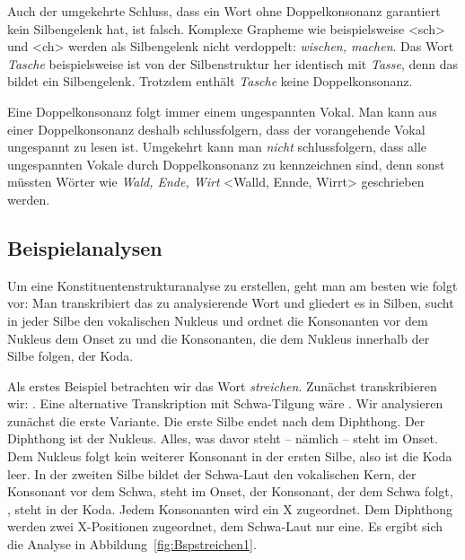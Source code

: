 Auch der umgekehrte Schluss, dass ein Wort ohne Doppelkonsonanz garantiert kein Silbengelenk hat, ist falsch. Komplexe Grapheme wie beispielsweise <sch> und <ch> werden als Silbengelenk nicht verdoppelt: \textit{wischen, machen}. Das Wort \textit{Tasche} beispielsweise ist von der Silbenstruktur her identisch mit \textit{Tasse}, denn das  bildet ein Silbengelenk. Trotzdem enthält \textit{Tasche} keine Doppelkonsonanz.

Eine Doppelkonsonanz folgt immer einem ungespannten Vokal. Man kann aus einer Doppelkonsonanz deshalb schlussfolgern, dass der vorangehende Vokal ungespannt zu lesen ist. Umgekehrt kann man \textit{nicht} schlussfolgern, dass alle ungespannten Vokale durch Doppelkonsonanz zu kennzeichnen sind, denn sonst müssten Wörter wie \textit{Wald, Ende, Wirt} <Walld, Ennde, Wirrt> geschrieben werden. 

\subsection{Beispielanalysen}

Um eine Konstituentenstrukturanalyse zu erstellen, geht man am besten wie folgt vor: Man transkribiert das zu analysierende Wort und gliedert es in Silben, sucht in jeder Silbe den vokalischen Nukleus und ordnet die Konsonanten vor dem Nukleus dem Onset zu und die Konsonanten, die dem Nukleus innerhalb der Silbe folgen, der Koda. 

Als erstes Beispiel betrachten wir das Wort \textit{streichen}. Zunächst transkribieren wir: . Eine alternative Transkription mit Schwa-Tilgung wäre . Wir analysieren zunächst die erste Variante. Die erste Silbe endet nach dem Diphthong. Der Diphthong ist der Nukleus. Alles, was davor steht \newline-- nämlich \textipa{[StK]} -- steht im Onset. Dem Nukleus folgt kein weiterer Konsonant in der ersten Silbe, also ist die Koda leer. In der zweiten Silbe \textipa{[\c{c}@n]} bildet der Schwa-Laut den vokalischen Kern, der Konsonant vor dem Schwa, \textipa{[\c{c}]} steht im Onset, der Konsonant, der dem Schwa folgt, \textipa{[n]}, steht in der Koda. Jedem Konsonanten wird ein X zugeordnet. Dem Diphthong werden zwei X-Positionen zugeordnet, dem Schwa-Laut nur eine. Es ergibt sich die Analyse in Abbildung~\ref{fig:Bspstreichen1}.


